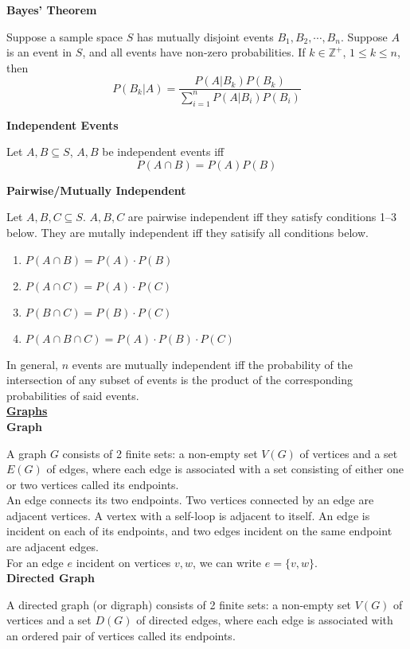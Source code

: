 \documentclass[a4paper]{article}
\newcommand{\heading}[1]{{\small\underline{\textbf{#1}}}}
\newcommand{\subheading}[1]{{\scriptsize\textbf{#1}}}
\begin{document}
\begin{multicols*}{4}
\subheading{Bayes' Theorem}

Suppose a sample space $S$ has mutually disjoint events $B_1, B_2, \cdots, B_n$.
Suppose $A$ is an event in $S$, and all events have non-zero probabilities. If
$k \in \mathbb{Z}^+$, $1 \leq k \leq n$, then
$$P(B_k|A) = \frac{P(A|B_k)P(B_k)}{
  \sum^n_{i=1} P(A|B_i)P(B_i)}$$

\subheading{Independent Events}

Let $A, B \subseteq S$, $A, B$ be independent events iff 
$$P(A \cap B) = P(A)P(B)$$

\subheading{Pairwise/Mutually Independent}

Let $A, B, C \subseteq S$. $A, B, C$ are pairwise independent iff they satisfy
conditions 1--3 below. They are mutally independent iff they satisify all
conditions below.
\begin{enumerate} \itemsep -0.5em
  \item $P(A \cap B) = P(A) \cdot P(B)$
  \item $P(A \cap C) = P(A) \cdot P(C)$
  \item $P(B \cap C) = P(B) \cdot P(C)$
  \item $P(A \cap B \cap C) = P(A) \cdot P(B) \cdot P(C)$
\end{enumerate}
In general, $n$ events are mutually independent iff the probability of the
intersection of any subset of events is the product of the corresponding
probabilities of said events.\\

\heading{Graphs}\\

\subheading{Graph}

A graph $G$ consists of 2 finite sets: a non-empty set $V(G)$ of vertices and a
set $E(G)$ of edges, where each edge is associated with a set consisting of
either one or two vertices called its endpoints.\\

An edge connects its two endpoints. Two vertices connected by an edge are
adjacent vertices. A vertex with a self-loop is adjacent to itself. An edge is
incident on each of its endpoints, and two edges incident on the same endpoint
are adjacent edges.\\

For an edge $e$ incident on vertices $v, w$, we can write $e = \{v, w\}$.\\

\subheading{Directed Graph}

A directed graph (or digraph) consists of 2 finite sets: a non-empty set $V(G)$
of vertices and a set $D(G)$ of directed edges, where each edge is associated
with an ordered pair of vertices called its endpoints.\\


\end{multicols*}
\end{document}
